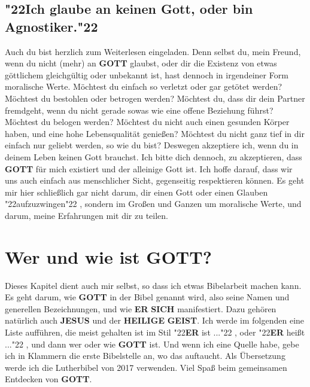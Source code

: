\documentclass[10pt,a5paper]{article}
\newcommand{\Er}[0]{\textbf{ER}}
\newcommand{\Geist}[0]{\textbf{GEIST}}
\newcommand{\Gott}[0]{\textbf{GOTT}}
\newcommand{\Heilige}[0]{\textbf{HEILIGE}}
\newcommand{\Jesus}[0]{\textbf{JESUS}}
\newcommand{\Sich}[0]{\textbf{SICH}}
\newcommand{\q}[1]{\char"22{#1}\char"22 }
\begin{document}
	\subsection{\q{Ich glaube an keinen Gott, oder bin Agnostiker.}}
		Auch du bist herzlich zum Weiterlesen eingeladen.
		Denn selbst du,
		mein Freund,
		wenn du nicht (mehr) an {\Gott} glaubst,
		oder dir die Existenz von etwas g\"ottlichem gleichg\"ultig oder unbekannt ist,
		hast dennoch in irgendeiner Form moralische Werte.
		M\"ochtest du einfach so verletzt oder gar get\"otet werden?
		M\"ochtest du bestohlen oder betrogen werden?
		M\"ochtest du,
		dass dir dein Partner fremdgeht,
		wenn du nicht gerade sowas wie eine offene Beziehung f\"uhrst?
		M\"ochtest du belogen werden?
		M\"ochtest du nicht auch einen gesunden K\"orper haben,
		und eine hohe Lebensqualit\"at genie{\ss}en?
		M\"ochtest du nicht ganz tief in dir einfach nur geliebt werden,
		so wie du bist?
		Deswegen akzeptiere ich,
		wenn du in deinem Leben keinen Gott brauchst.
		Ich bitte dich dennoch,
		zu akzeptieren,
		dass {\Gott} f\"ur mich existiert und der alleinige Gott ist.
		Ich hoffe darauf,
		dass wir uns auch einfach aus menschlicher Sicht,
		gegenseitig respektieren k\"onnen.
		Es geht mir hier schlie{\ss}lich gar nicht darum,
		dir einen Gott oder einen Glauben \q{aufzuzwingen},
		sondern im Gro{\ss}en und Ganzen um moralische Werte,
		und darum,
		meine Erfahrungen mit dir zu teilen.

	\newpage
	\section{Wer und wie ist {\Gott}?}
		Dieses Kapitel dient auch mir selbst,
		so dass ich etwas Bibelarbeit machen kann.
		Es geht darum,
		wie {\Gott} in der Bibel genannt wird,
		also seine Namen und generellen Bezeichnungen,
		und wie {\Er} {\Sich} manifestiert.
		Dazu geh\"oren nat\"urlich auch {\Jesus} und der {\Heilige} {\Geist}.
		Ich werde im folgenden eine Liste auff\"uhren,
		die meist gehalten ist im Stil \q{{\Er} ist ...},
		oder \q{{\Er} hei{\ss}t ...},
		und dann wer oder wie {\Gott} ist.
		Und wenn ich eine Quelle habe,
		gebe ich in Klammern die erste Bibelstelle an,
		wo das auftaucht.
		Als \"Ubersetzung werde ich die Lutherbibel von 2017 verwenden.
		Viel Spa{\ss} beim gemeinsamen Entdecken von {\Gott}.
	
\end{document}
